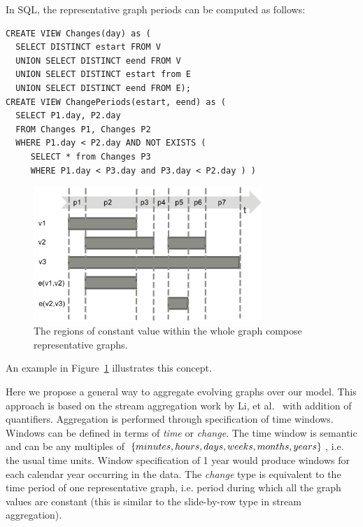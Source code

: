 In SQL, the representative graph periods can be computed as follows:

\begin{small}
\begin{verbatim}
CREATE VIEW Changes(day) as (
  SELECT DISTINCT estart FROM V
  UNION SELECT DISTINCT eend FROM V
  UNION SELECT DISTINCT estart from E
  UNION SELECT DISTINCT eend FROM E);
CREATE VIEW ChangePeriods(estart, eend) as (
  SELECT P1.day, P2.day
  FROM Changes P1, Changes P2
  WHERE P1.day < P2.day AND NOT EXISTS (
     SELECT * from Changes P3
     WHERE P1.day < P3.day and P3.day < P2.day ) )
\end{verbatim}
\end{small}

\begin{figure}
\centering
\includegraphics[width=3.4in]{figs/change_timeline.pdf}
\caption{The regions of constant value within the whole graph compose
  representative graphs.}
\label{fig:changes}
\end{figure}

An example in Figure~\ref{fig:changes} illustrates this concept.

Here we propose a general way to aggregate evolving graphs over our
model.  This approach is based on the stream aggregation work by Li,
et al.~\cite{Li2005} with addition of quantifiers.  Aggregation is
performed through specification of time windows.  Windows can be
defined in terms of {\em time} or {\em change}.  The time window is
semantic and can be any multiples of $\{minutes, hours, days, weeks,
\\ months, years\}$, i.e. the usual time units.  Window specification
of 1 year would produce windows for each calendar year occurring in
the data.  The {\em change} type is equivalent to the time period of
one representative graph, i.e. period during which all the graph
values are constant (this is similar to the slide-by-row type in
stream aggregation).


